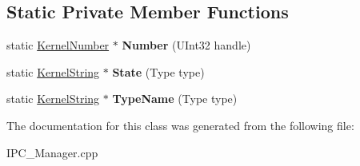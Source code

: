 \subsection*{Static Private Member Functions}
\begin{DoxyCompactItemize}
\item 
\mbox{\label{class_i_p_c___manager___internal_1_1_entry_ac72cd2f47ac111bba36fd03cbecee9b6}} 
static \hyperlink{class_kernel_number}{Kernel\+Number} $\ast$ {\bfseries Number} (U\+Int32 handle)
\item 
\mbox{\label{class_i_p_c___manager___internal_1_1_entry_a28d84c1ef0d3cdd6d30183fe9d3f6766}} 
static \hyperlink{class_kernel_string}{Kernel\+String} $\ast$ {\bfseries State} (Type type)
\item 
\mbox{\label{class_i_p_c___manager___internal_1_1_entry_a0f2be2d7dd6403bdac2a8a2a5483bdc2}} 
static \hyperlink{class_kernel_string}{Kernel\+String} $\ast$ {\bfseries Type\+Name} (Type type)
\end{DoxyCompactItemize}


The documentation for this class was generated from the following file\+:\begin{DoxyCompactItemize}
\item 
I\+P\+C\+\_\+\+Manager.\+cpp\end{DoxyCompactItemize}
